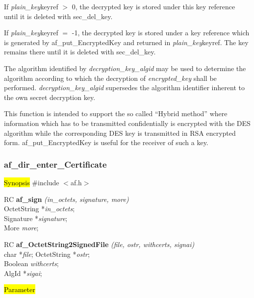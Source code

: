 If {\em plain\_key}\pf keyref $>$ 0, the decrypted key is stored under this key reference until it is
deleted with sec\_del\_key. 

If {\em plain\_key}\pf keyref $=$ -1, the decrypted key is stored under a key reference which is generated 
by af\_put\_EncryptedKey and returned in {\em plain\_key}\pf keyref. The key remains there until it is deleted
with sec\_del\_key. 

The algorithm identified by {\em decryption\_key\_algid} may be used to determine the algorithm
according to which the decryption of {\em encrypted\_key} shall be performed. {\em decryption\_key\_algid}
supersedes the algorithm identifier inherent to the own secret decryption key.

This function is intended to support the so called ``Hybrid method'' where information which
has to be transmitted confidentially is encrypted with the DES algorithm while the corresponding DES key
is transmitted in RSA encrypted form. af\_put\_EncryptedKey is useful for the receiver
of such a key.

\subsubsection{af\_dir\_enter\_Certificate}
\label{af_sign}
\hl{Synopsis}
\#include $<$af.h$>$

RC {\bf af\_sign} {\em (in\_octets, signature, more)} \\
OctetString *{\em in\_octets}; \\
Signature *{\em signature}; \\
More {\em more};

RC {\bf af\_OctetString2SignedFile} {\em (file, ostr, withcerts, signai)} \\
char *{\em file};
OctetString *{\em ostr}; \\
Boolean {\em withcerts}; \\
AlgId *{\em sigai};

\hl{Parameter}




